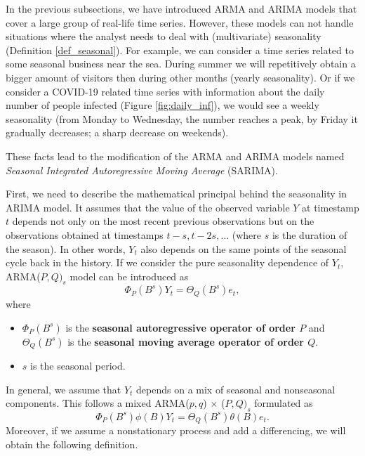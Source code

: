 In the previous subsections, we have introduced ARMA and ARIMA models that cover a large group of real-life time series. However, these models can not handle situations where the analyst needs to deal with (multivariate) seasonality (Definition \ref{def_seasonal}). For example, we can consider a time series related to some seasonal business near the sea. During summer we will repetitively obtain a bigger amount of visitors then during other months (yearly seasonality). Or if we consider a COVID-19 related time series with information about the daily number of people infected (Figure \ref{fig:daily_inf}), we would see a weekly seasonality (from Monday to Wednesday, the number reaches a peak, by Friday it gradually decreases; a sharp decrease on weekends). 

These facts lead to the modification of the ARMA and ARIMA models named \textit{Seasonal Integrated Autoregressive Moving Average} (SARIMA).

First, we need to describe the mathematical principal behind the seasonality in ARIMA model. It assumes that the value of the observed variable $Y$ at timestamp $t$ depends not only on the most recent previous observations but on the observations obtained at timestamps $t-s, t-2s, \ldots$ (where $s$ is the duration of the season). In other words, $Y_t$ also depends on the same points of the seasonal cycle back in the history. 
If we consider the pure seasonality dependence of $Y_t$, ARMA($P, Q)_{s}$ model \cite{shumway2011} can be introduced as \begin{equation}
    \Phi_{P}(B^s)Y_t = \Theta_Q(B^s)e_t,
\end{equation}
where \begin{itemize}
    \item $\Phi_{P}(B^s)$ is the \textbf{seasonal autoregressive operator of order $P$} and $\Theta_Q(B^s)$ is the \textbf{seasonal moving average operator of order $Q$}.
    \item $s$ is the seasonal period.
\end{itemize} In general, we assume that $Y_t$ depends on a mix of seasonal and nonseasonal components. This follows a mixed ARMA($p, q$) $\times$ ($P, Q)_s$ formulated as \begin{equation}
    \Phi_{P}(B^s)\phi(B)Y_t = \Theta_Q(B^s)\theta(B)e_t.
\end{equation} Moreover, if we assume a nonstationary process and add a differencing, we will obtain the following definition.


